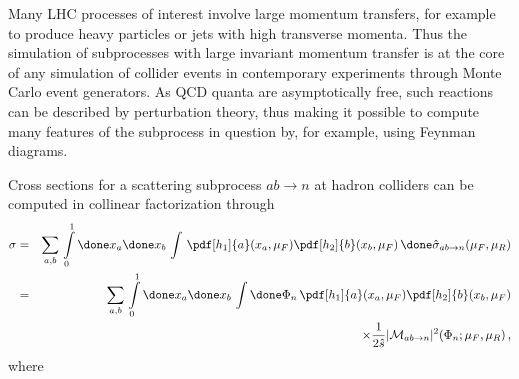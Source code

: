 Many LHC processes of interest involve large momentum transfers, for
example to produce heavy particles or jets with high transverse momenta.
Thus the simulation of subprocesses with large invariant momentum
transfer is at the core of any simulation of collider events in
contemporary experiments through Monte Carlo event generators. As QCD
quanta are asymptotically free, such reactions can be described by
perturbation theory, thus making it possible to compute many features
of the subprocess in question by, for example, using Feynman diagrams.

Cross sections for a scattering subprocess $ab\to n$ at hadron colliders 
can be computed in collinear factorization through~\cite{Ellis:1991qj}
\begin{eqnarray}
\label{Eq::Master_For_XSec}
\sigma%
&=&
\sum\limits_{a,b}\,\int\limits_{0}^{1}\done x_a\done x_b\,\int\,
\pdf[h_1]{a}(x_a,\mu_F)\pdf[h_2]{b}(x_b,\mu_F)\,
\done\hat\sigma_{ab\to n}(\mu_F,\mu_R)\\
&=&
\sum\limits_{a,b}\,\int\limits_{0}^{1}\done x_a\done x_b\,\int\done\Phi_n\,
\pdf[h_1]{a}(x_a,\mu_F)\pdf[h_2]{b}(x_b,\mu_F)\nonumber\\
&&\qquad\times\frac{1}{2\hat s}|{\cal M}_{ab\to n}|^2(\Phi_n;\mu_F,\mu_R)\,,
\nonumber
\end{eqnarray}
where

